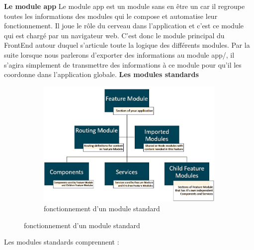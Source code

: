 \documentclass{article}
\begin{document}
\newpage
\textbf{Le module app}
\newline
\newline
Le module app est un module sans en être un car il regroupe toutes les informations des modules qui le compose et automatise leur fonctionnement.
Il joue le rôle du cerveau dans l'application et c'est ce module qui est chargé par un navigateur web. C'est donc le module principal du FrontEnd autour duquel s'articule toute la logique des différents modules.
Par la suite lorsque nous parlerons d'exporter des informations au module app/, il s'agira simplement de transmettre des informations à ce module pour qu'il les coordonne dans l'application globale.
\newline
\newline
\textbf{Les modules standards}
\newline
\begin{figure}[h!]
	\centering
  	\begin{subfigure}[b]{1.0\linewidth}
	\includegraphics[width=\linewidth]{ang.jpeg}
	\caption{fonctionnement d'un module standard}
  	\end{subfigure}
\end{figure}
\newline
Les modules standards comprennent :
\end{document}
